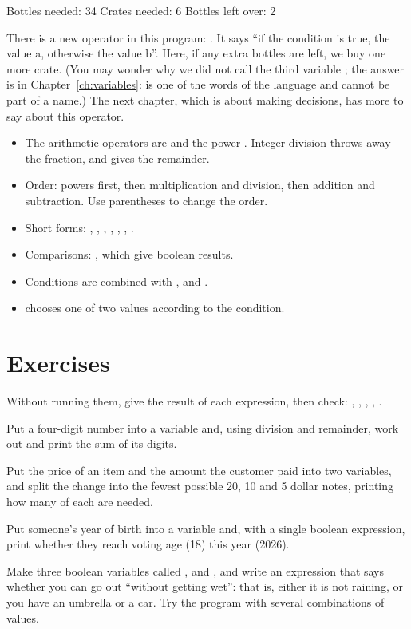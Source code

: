 \begin{salamout}
Bottles needed: 34
Crates needed: 6
Bottles left over: 2
\end{salamout}

There is a new operator in this program: . It says
``if the condition is true, the value a, otherwise the value b''. Here, if
any extra bottles are left, we buy one more crate. (You may wonder why we did
not call the third variable ; the answer is in
Chapter~\ref{ch:variables}:  is one of the words of the language
and cannot be part of a name.) The next chapter, which is about making
decisions, has more to say about this operator.

\begin{summary}
\begin{itemize}
  \item The arithmetic operators are \code{+ - * / \%} and the power
        \code{**}. Integer division throws away the fraction, and
        \code{\%} gives the remainder.
  \item Order: powers first, then multiplication and division, then
        addition and subtraction. Use parentheses to change the order.
  \item Short forms: \code{+=}, \code{-=}, \code{*=}, \code{/=},
        \code{\%=}, \code{++}, \code{--}.
  \item Comparisons: \code{== != < > <= >=}, which give boolean results.
  \item Conditions are combined with ,  and .
  \item {} chooses one of two values according to the
        condition.
\end{itemize}
\end{summary}

\section*{Exercises}

\exercise Without running them, give the result of each expression, then
check: , , ,
, .

\exercise Put a four-digit number into a variable and, using division and
remainder, work out and print the sum of its digits.

\exercise Put the price of an item and the amount the customer paid into two
variables, and split the change into the fewest possible 20, 10 and 5 dollar
notes, printing how many of each are needed.

\exercise Put someone's year of birth into a variable and, with a single
boolean expression, print whether they reach voting age (18) this year
(2026).

\exercise Make three boolean variables called ,
 and , and write an expression
that says whether you can go out ``without getting wet'': that is, either it
is not raining, or you have an umbrella or a car. Try the program with
several combinations of values.
